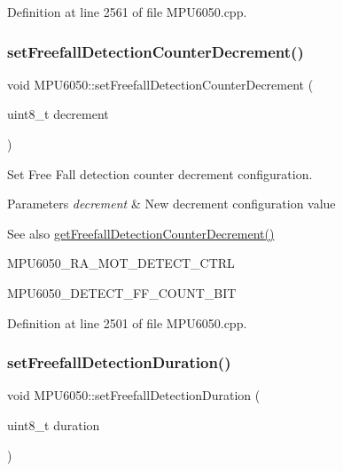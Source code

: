 Definition at line 2561 of file M\+P\+U6050.\+cpp.

\mbox{\label{classMPU6050_a18dd79b7c53600e9ce97eed4bfe6cf15}} 
\subsubsection{\texorpdfstring{setFreefallDetectionCounterDecrement()}{setFreefallDetectionCounterDecrement()}}
{\footnotesize\ttfamily void M\+P\+U6050\+::set\+Freefall\+Detection\+Counter\+Decrement (\begin{DoxyParamCaption}\item[{uint8\+\_\+t}]{decrement }\end{DoxyParamCaption})}



Set Free Fall detection counter decrement configuration. 


\begin{DoxyParams}{Parameters}
{\em decrement} & New decrement configuration value \\
\hline
\end{DoxyParams}
\begin{DoxySeeAlso}{See also}
\mbox{\hyperlink{classMPU6050_af6d6fa9869636989a8b29c4827ad7de8}{get\+Freefall\+Detection\+Counter\+Decrement()}} 

M\+P\+U6050\+\_\+\+R\+A\+\_\+\+M\+O\+T\+\_\+\+D\+E\+T\+E\+C\+T\+\_\+\+C\+T\+RL 

M\+P\+U6050\+\_\+\+D\+E\+T\+E\+C\+T\+\_\+\+F\+F\+\_\+\+C\+O\+U\+N\+T\+\_\+\+B\+IT 
\end{DoxySeeAlso}


Definition at line 2501 of file M\+P\+U6050.\+cpp.

\mbox{\label{classMPU6050_a41eeb40a654465966d260e3d31c4de4b}} 
\subsubsection{\texorpdfstring{setFreefallDetectionDuration()}{setFreefallDetectionDuration()}}
{\footnotesize\ttfamily void M\+P\+U6050\+::set\+Freefall\+Detection\+Duration (\begin{DoxyParamCaption}\item[{uint8\+\_\+t}]{duration }\end{DoxyParamCaption})}



